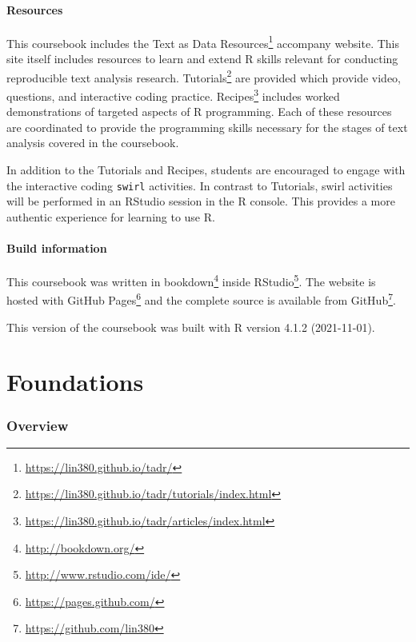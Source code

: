 \documentclass[
]{article}
\DeclareRobustCommand{\href}[2]{#2\footnote{\url{#1}}}
\begin{document}
\hypertarget{resources}{%
\subsection*{Resources}\label{resources}}

This coursebook includes the \href{https://lin380.github.io/tadr/}{Text as Data Resources} accompany website. This site itself includes resources to learn and extend R skills relevant for conducting reproducible text analysis research. \href{https://lin380.github.io/tadr/tutorials/index.html}{Tutorials} are provided which provide video, questions, and interactive coding practice. \href{https://lin380.github.io/tadr/articles/index.html}{Recipes} includes worked demonstrations of targeted aspects of R programming. Each of these resources are coordinated to provide the programming skills necessary for the stages of text analysis covered in the coursebook.

In addition to the Tutorials and Recipes, students are encouraged to engage with the interactive coding \texttt{swirl} activities. In contrast to Tutorials, swirl activities will be performed in an RStudio session in the R console. This provides a more authentic experience for learning to use R.

\hypertarget{build-information}{%
\subsection*{Build information}\label{build-information}}

This coursebook was written in \href{http://bookdown.org/}{bookdown} inside \href{http://www.rstudio.com/ide/}{RStudio}. The website is hosted with \href{https://pages.github.com/}{GitHub Pages} and the complete source is available from \href{https://github.com/lin380}{GitHub}.

This version of the coursebook was built with R version 4.1.2 (2021-11-01).

\hypertarget{part-foundations}{%
\part{Foundations}\label{part-foundations}}

\hypertarget{foundations-overview}{%
\section*{Overview}\label{foundations-overview}}
\end{document}
